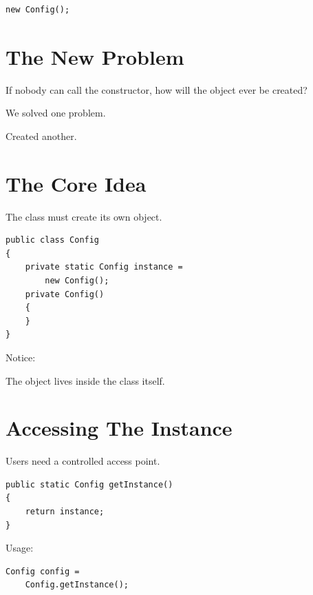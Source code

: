 \documentclass[11pt,a4paper]{book}
\begin{document}
\begin{verbatim}
new Config();
\end{verbatim}


\section{The New Problem}

\begin{trap}

If nobody can call the constructor,
how will the object ever be created?

We solved one problem.

Created another.

\end{trap}


\section{The Core Idea}

The class must create its own object.

\begin{verbatim}
public class Config
{
    private static Config instance =
        new Config();
    private Config()
    {
    }
}
\end{verbatim}

Notice:

The object lives inside the class itself.


\section{Accessing The Instance}

Users need a controlled access point.

\begin{verbatim}
public static Config getInstance()
{
    return instance;
}
\end{verbatim}

Usage:

\begin{verbatim}
Config config =
    Config.getInstance();
\end{verbatim}

\end{document}
